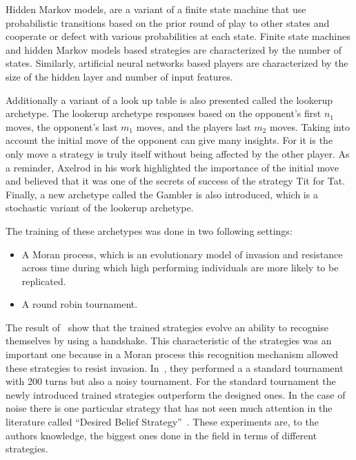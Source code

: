 \documentclass{article}
\theoremstyle{definition}
\begin{document}
Hidden Markov models, are a variant of a finite state machine that use probabilistic
transitions based on the prior round of play to other states and cooperate or
defect with various probabilities at each state. Finite state machines and hidden Markov models
based strategies are characterized by the number of states. Similarly, artificial
neural networks based players are characterized by the size of the hidden layer
and number of input features.

Additionally a variant of a look up table is also presented called the lookerup
archetype. The lookerup archetype responses based on the opponent's first \(n_1\)
moves, the opponent's last \(m_1\) moves, and the players last \(m_2\) moves.
Taking into account the initial move of the opponent can give many insights.
For it is the only move a strategy is truly itself without being affected by
the other player. As a reminder, Axelrod in his work highlighted the importance
of the initial move and believed that it was one of the secrets of success of the
strategy Tit for Tat. Finally, a new archetype called the Gambler is also introduced,
which is a stochastic variant of the lookerup archetype.

The training of these archetypes was done in two following settings:

\begin{itemize}
    \item A Moran process, which is an evolutionary model of invasion and resistance across
    time during which high performing individuals are more likely to be replicated.
    \item A round robin tournament.
\end{itemize}

The result of~\cite{KnightHGC17} show that the trained strategies evolve an ability
to recognise themselves by using a handshake. This characteristic of the strategies
was an important one because in a Moran process this recognition mechanism allowed these
strategies to resist invasion. In~\cite{Knight2017}, they performed a
a standard tournament with 200 turns but also a noisy tournament. For the standard
tournament the newly introduced trained strategies outperform the designed ones.
In the case of noise there is one particular strategy that has not seen much
attention in the literature called ``Desired Belief Strategy''~\cite{Au2006}.
These experiments are, to the authors knowledge, the biggest ones done in the
field in terms of different strategies.
\end{document}
